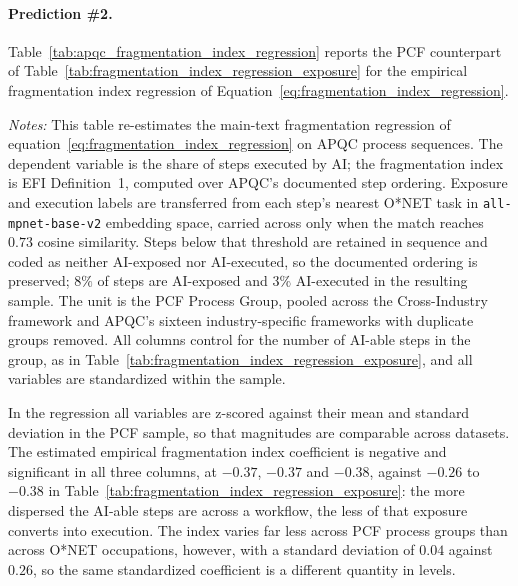 \paragraph{Prediction \#2.}
Table~\ref{tab:apqc_fragmentation_index_regression} reports the PCF counterpart of Table~\ref{tab:fragmentation_index_regression_exposure} for the empirical fragmentation index regression of Equation~\eqref{eq:fragmentation_index_regression}.
\begin{table}[h!]
    \caption{Fragmentation and AI Execution on APQC's Documented Process Sequences}
    \label{tab:apqc_fragmentation_index_regression}
    \begin{center}
    
    \end{center}
    \raggedright \footnotesize{\emph{Notes:}} This table re-estimates the main-text fragmentation regression of equation~\eqref{eq:fragmentation_index_regression} on APQC process sequences.
    The dependent variable is the share of steps executed by AI; the fragmentation index is EFI Definition~1, computed over APQC's documented step ordering.
    Exposure and execution labels are transferred from each step's nearest O*NET task in \texttt{all-mpnet-base-v2} embedding space, carried across only when the match reaches $0.73$ cosine similarity.
    Steps below that threshold are retained in sequence and coded as neither AI-exposed nor AI-executed, so the documented ordering is preserved; $8\%$ of steps are AI-exposed and $3\%$ AI-executed in the resulting sample.
    The unit is the PCF Process Group, pooled across the Cross-Industry framework and APQC's sixteen industry-specific frameworks with duplicate groups removed.
    All columns control for the number of AI-able steps in the group, as in Table~\ref{tab:fragmentation_index_regression_exposure}, and all variables are standardized within the sample.
\end{table}
In the regression all variables are z-scored against their mean and standard deviation in the PCF sample, so that magnitudes are comparable across datasets.
The estimated empirical fragmentation index coefficient is negative and significant in all three columns, at $-0.37$, $-0.37$ and $-0.38$, against $-0.26$ to $-0.38$ in Table~\ref{tab:fragmentation_index_regression_exposure}: the more dispersed the AI-able
steps are across a workflow, the less of that exposure converts into execution.
The index varies far less across PCF process groups than across O*NET occupations, however, with a standard
deviation of $0.04$ against $0.26$, so the same standardized coefficient is a different quantity in levels.
